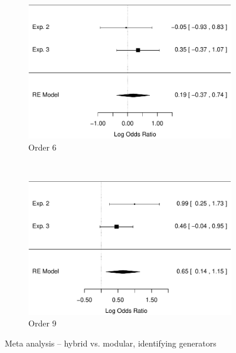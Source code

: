 \documentclass[man,10pt]{apa6}
\begin{document}
\begin{figure}
\centering
\begin{subfigure}[c]{0.4\textwidth}
\centering
\includegraphics[width=\textwidth]{figures/meta/question_typegenerator_true_6_conditionhybrid.pdf}
\caption{Order 6}
\end{subfigure}
~
\begin{subfigure}[c]{0.4\textwidth}
\centering
\includegraphics[width=\textwidth]{figures/meta/question_typegenerator_true_9_conditionhybrid.pdf}
\caption{Order 9}
\end{subfigure}
\caption{Meta analysis -- hybrid vs. modular, identifying generators}
\label{meta_genT_h}
\end{figure}\noindent 
\end{document}
